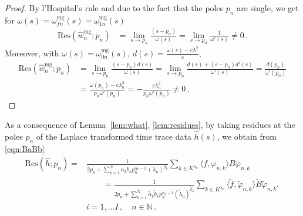 \begin{proof}
By l'Hospital's rule and due to the fact that the poles $p_n$ are single, we get for $\omega(s)=\omega^{\text{mg}}_{fn}(s)=\omega^{\text{mg}}_{1n}(s)$
\[
\begin{aligned}
\mbox{Res}(\hat{w}^{\text{mg}}_n;p_n)&=\lim_{s\to p_n}\frac{(s-p_n)}{\omega(s)}
=\lim_{s\to p_n}\frac{1}{\omega'(s)}\not=0\,.
\end{aligned}
\]
Moreover, with $\omega(s)=\omega^{\text{mg}}_{0n}(s)$, $d(s)=\frac{\omega(s)-c\lambda^2}{s}$,
\[
\begin{aligned}
\mbox{Res}(\hat{w}^{\text{mg}}_n;p_n)&=\lim_{s\to p_n}\frac{(s-p_n)d(s)}{\omega(s)}
=\lim_{s\to p_n}\frac{d(s)+(s-p_n)d'(s)}{\omega'(s)}=\frac{d(p_n)}{\omega'(p_n)}\\
&=\frac{\omega(p_n)-c\lambda_n^2}{p_n\omega'(p_n)}=-\frac{c\lambda_n^2}{p_n\omega'(p_n)}\not=0\,.
\end{aligned}
\]
\end{proof}

As a consequence of Lemma~\ref{lem:what}, \ref{lem:residues}, by taking residues at the poles $p_n$ of the Laplace transformed time trace data $\hat{h}(s)$, 
we obtain from \eqref{eqn:BaBb} 
\begin{equation}\label{eqn:BaBb_residues}
\begin{aligned}
\mbox{Res}(\hat{h};p_n)=&\frac{1}{
2p_n+\sum_{k=1}^N \alpha_k b_k p_n^{\alpha_k-1}\, (\lambda_{n})^{\beta_k}}
\sum_{k\in K^{\lambda_n}}\langle f,\varphi_{n,k}\rangle B\varphi_{n,k}
\\&\qquad
=\frac{1}{
2p_n+\sum_{k=1}^{\tilde N} {\tilde \alpha}_k \tilde{b}_k p_n^{{\tilde \alpha}_k-1}({\tilde \lambda}_{n})^{\tilde{\beta}_k}}
\sum_{k\in K^{\tilde{\lambda}_n}} \langle {\tilde f},{\tilde \varphi}_{n,k}\rangle {\tilde B} {\tilde \varphi}_{n,k}
, \\ 
&i=1,\ldots I\,, \quad n\in\mathbb{N}\,. 
\end{aligned}
\end{equation}

